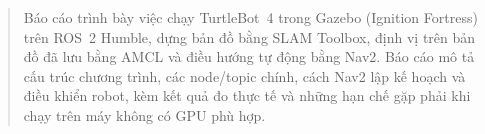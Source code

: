 \documentclass[11pt,a4paper]{article}
\begin{document}

\begin{abstract}\noindent
Báo cáo trình bày việc chạy TurtleBot~4 trong Gazebo (Ignition Fortress) trên ROS~2 Humble,
dựng bản đồ bằng SLAM Toolbox, định vị trên bản đồ đã lưu bằng AMCL và điều hướng tự động bằng Nav2.
Báo cáo mô tả cấu trúc chương trình, các node/topic chính, cách Nav2 lập kế hoạch và điều khiển robot,
kèm kết quả đo thực tế và những hạn chế gặp phải khi chạy trên máy không có GPU phù hợp.
\end{abstract}
\tableofcontents
\newpage








\end{document}
